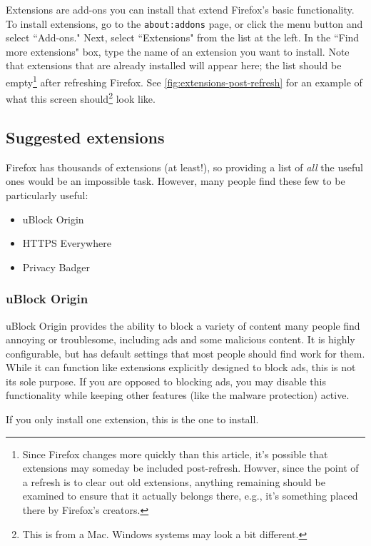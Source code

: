 \documentclass[fontsize=11pt]{article}
\begin{document}
Extensions are add-ons you can install that extend Firefox's basic functionality.  To install extensions, go to the \texttt{about:addons} page, or click the menu button and select ``Add-ons."  Next, select ``Extensions" from the list at the left.  In the ``Find more extensions" box, type the name of an extension you want to install.  Note that extensions that are already installed will appear here; the list should be empty\footnote{Since Firefox changes more quickly than this article, it's possible that extensions may someday be included post-refresh.  Howver, since the point of a refresh is to clear out old extensions, anything remaining should be examined to ensure that it actually belongs there, e.g., it's something placed there by Firefox's creators.} after refreshing Firefox.  See \cref{fig:extensions-post-refresh} for an example of what this screen should\footnote{This is from a Mac.  Windows systems may look a bit different.} look like.




\subsection{Suggested extensions}
Firefox has thousands of extensions (at least!), so providing a list of \emph{all} the useful ones would be an impossible task.  However, many people find these few to be particularly useful:

\begin{itemize}
	\item uBlock Origin
	\item HTTPS Everywhere
	\item Privacy Badger
\end{itemize}


\subsubsection{uBlock Origin}
 uBlock Origin provides the ability to block a variety of content many people find annoying or troublesome, including ads and some malicious content.  It is highly configurable, but has default settings that most people should find work for them.  While it can function like extensions explicitly designed to block ads, this is not its sole purpose.  If you are  opposed to blocking ads, you may disable this functionality while keeping other features (like the malware protection) active.

 If you only install one extension, this is the one to install.
\end{document}
